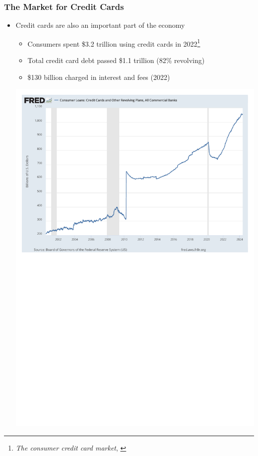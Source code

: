 \begin{frame}
\frametitle{The Market for Credit Cards}
\begin{itemize}
    \item Credit cards are also an important part of the economy
    \begin{itemize}
        \item Consumers spent \$3.2 trillion using credit cards in 2022\footnote{\emph{The consumer credit card market}, \citet{cfpb:2023}}
        \item Total credit card debt passed \$1.1 trillion (82\% revolving)
        \item \$130 billion charged in interest and fees (2022)
    \end{itemize}
    \begin{center}
        \includegraphics[width=.75\textwidth]{../Misc/FRED_CCDebt.pdf}
    \end{center}
\end{itemize}
\end{frame}

